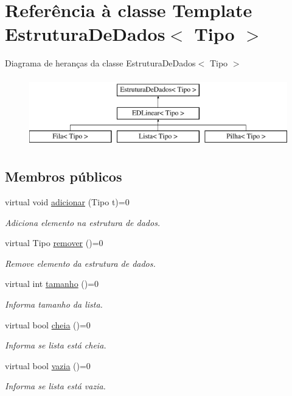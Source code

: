 \hypertarget{classEstruturaDeDados}{\section{Referência à classe Template Estrutura\-De\-Dados$<$ Tipo $>$}
\label{classEstruturaDeDados}
}
Diagrama de heranças da classe Estrutura\-De\-Dados$<$ Tipo $>$\begin{figure}[H]
\begin{center}
\leavevmode
\includegraphics[height=3.000000cm]{classEstruturaDeDados}
\end{center}
\end{figure}
\subsection*{Membros públicos}
\begin{DoxyCompactItemize}
\item 
virtual void \hyperlink{classEstruturaDeDados_a66bd359407b52b76b5be611ef25cf847}{adicionar} (Tipo t)=0
\begin{DoxyCompactList}\small\item\em Adiciona elemento na estrutura de dados. \end{DoxyCompactList}\item 
virtual Tipo \hyperlink{classEstruturaDeDados_a01ddc5aec2e4a425e4021055c15e7f02}{remover} ()=0
\begin{DoxyCompactList}\small\item\em Remove elemento da estrutura de dados. \end{DoxyCompactList}\item 
virtual int \hyperlink{classEstruturaDeDados_aedcdd78aed7517cfad5ddbe374d7ce88}{tamanho} ()=0
\begin{DoxyCompactList}\small\item\em Informa tamanho da lista. \end{DoxyCompactList}\item 
virtual bool \hyperlink{classEstruturaDeDados_a5d7866e13c2e6129e42979093569348c}{cheia} ()=0
\begin{DoxyCompactList}\small\item\em Informa se lista está cheia. \end{DoxyCompactList}\item 
virtual bool \hyperlink{classEstruturaDeDados_aa45fc3c6284cba7c27b9cd128e71a079}{vazia} ()=0
\begin{DoxyCompactList}\small\item\em Informa se lista está vazia. \end{DoxyCompactList}\end{DoxyCompactItemize}


